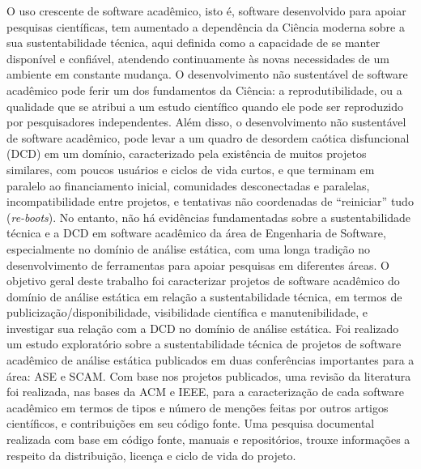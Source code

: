 O uso crescente de software acadêmico, isto é, software desenvolvido para apoiar pesquisas
científicas, %
tem aumentado a dependência da Ciência moderna sobre a sua sustentabilidade técnica,
aqui definida como a capacidade de se manter disponível e confiável, %
atendendo continuamente às novas necessidades de um ambiente %
em constante mudança.
%
O desenvolvimento não sustentável de software acadêmico pode 
ferir um dos fundamentos da Ciência:
a reprodutibilidade, ou a qualidade que se atribui a um estudo científico 
quando ele pode ser reproduzido por pesquisadores independentes. 
Além disso, o desenvolvimento não sustentável de software acadêmico,
pode levar a um quadro de desordem caótica disfuncional (DCD) em um domínio,
caracterizado pela existência de muitos projetos similares, com poucos
usuários e ciclos de vida curtos, e que terminam em paralelo ao financiamento
inicial,  comunidades desconectadas e paralelas, incompatibilidade entre
projetos, e tentativas não coordenadas de ``reiniciar'' tudo
({\it re-boots}).
No entanto, não há evidências fundamentadas sobre a sustentabilidade técnica
e a DCD em software acadêmico da área de Engenharia de Software, especialmente
no domínio de análise estática, com uma longa tradição no
desenvolvimento de ferramentas para apoiar pesquisas em diferentes áreas.
O objetivo geral deste trabalho foi caracterizar projetos de software acadêmico
do domínio de análise estática em relação a sustentabilidade técnica, em termos
de publicização/disponibilidade, visibilidade
científica e manutenibilidade,
e investigar sua relação com a DCD no domínio de análise estática.
Foi realizado um estudo exploratório sobre a sustentabilidade
técnica de projetos de software acadêmico de análise estática 
publicados em duas conferências importantes para a área: ASE e SCAM.
%
Com base nos projetos publicados,  %
uma revisão da literatura foi realizada,
nas bases da ACM e IEEE, 
para a caracterização de cada software acadêmico em termos de
tipos e número de menções feitas por outros artigos científicos,
e contribuições em seu código fonte.
Uma pesquisa documental realizada com base em 
código fonte, manuais e repositórios, trouxe informações a respeito da
distribuição, licença e ciclo de vida do projeto.
